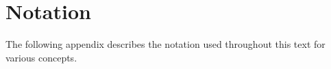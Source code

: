 \chapter{Notation}\label{appendix:notation}

The following appendix describes the notation used throughout this text for
various concepts.



%
